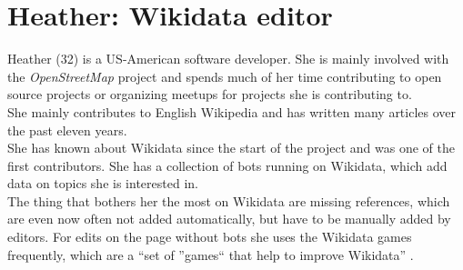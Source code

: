 \section{Heather: Wikidata editor}
Heather (32) is a US-American software developer. She is mainly involved with the \textit{OpenStreetMap} project and spends much of her time contributing to open source projects or organizing meetups for projects she is contributing to. \\
She mainly contributes to English Wikipedia and has written many articles over the past eleven years. \\
She has known about Wikidata since the start of the project and was one of the first contributors. She has a collection of bots running on Wikidata, which add data on topics she is interested in. \\
The thing that bothers her the most on Wikidata are missing references, which are even now often not added automatically, but have to be manually added by editors. For edits on the page without bots she uses the Wikidata games frequently, which are a ``set of ''games`` that help to improve Wikidata'' \citep{wikidatagame}.